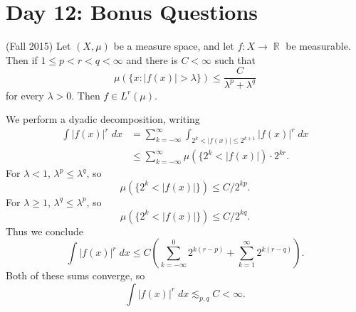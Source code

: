 \documentclass{exam}
\DeclareMathOperator{\RR}{\mathbb{R}}
\theoremstyle{problemstyle}
\newcommand{\1}[1]{\textbf{1}_{\left[#1\right]}} %
\begin{document}
\begin{questions}
\begin{parts}
\begin{solution}
\begin{comment}
    
    Any element of $H^1(\RR_+)$ is continuous, and has a well defined value at zero (a trace). Given $f \in H^1(\RR_+)$, define
    \[ T^*f(x) = \begin{cases} f(0) e^x &: x < 0 \\ f(x) &: x > 0. \end{cases} \]
    Then $T^* f$ is obviously square integrable, and
    \begin{align*}
        \int T^*f(x) \phi(x)\; dx &= f(0) \int_{-\infty}^0 e^x \phi'(x)\; dx + \int_0^\infty f(x) \phi'(x)\; dx\\
        &= f(0) \left[ \phi'(0) - \int_{-\infty}^0 e^x \phi(x)\; dx \right] + \int_0^\infty f(x) \phi'(x)\; dx\\
        &= - f(0) \int_{-\infty}^0 e^x \phi(x)\; dx + \int_0^\infty f(x) \phi'(x)\; dx
    \end{align*}
    
    
    One can argue (Morrey's inequality for example, plus the density of $C_c^\infty(\RR)$ in $H^1(\RR)$), that if $g \in K$, then $g(0) = 0$.
\end{comment}
\end{solution}

\end{parts}







\newpage
\section{Day 12: Bonus Questions}

\question (Fall 2015) Let $(X, \mu)$ be a measure space, and let $f: X \to \RR$ be measurable. Then if $1 \leq p < r < q < \infty$ and there is $C < \infty$ such that
%
\[ \mu(\{ x : |f(x)| > \lambda \}) \leq \frac{C}{\lambda^p + \lambda^q} \]
%
for every $\lambda > 0$. Then $f \in L^r(\mu)$.
\begin{solution}
    We perform a dyadic decomposition, writing
    \begin{align*}
        \int |f(x)|^r\; dx &= \sum_{k = -\infty}^\infty \int_{2^k < |f(x)| \leq 2^{k+1}} |f(x)|^r\; dx\\
        &\leq \sum_{k = -\infty}^\infty \mu(\{ 2^k < |f(x)|) \cdot 2^{kr}.
    \end{align*}
    For $\lambda < 1$, $\lambda^p \leq \lambda^q$, so
    \[ \mu(\{ 2^k < |f(x)| \}) \leq C/2^{kp}. \]
    For $\lambda \geq 1$, $\lambda^q \leq \lambda^p$, so
    \[ \mu(\{ 2^k < |f(x)| \}) \leq C/2^{kq}. \]
    Thus we conclude
    \[ \int |f(x)|^r\; dx \leq C \left( \sum_{k = -\infty}^0 2^{k(r - p)} + \sum_{k = 1}^\infty 2^{k(r - q)} \right). \]
    Both of these sums converge, so
    \[  \int |f(x)|^r\; dx \lesssim_{p,q} C < \infty. \]
\end{solution}


\end{questions}
\end{document}
